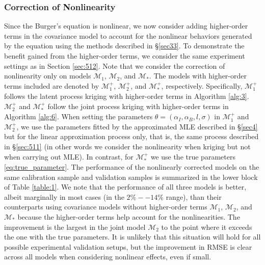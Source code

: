 \documentclass[article,ij4uq]{ij4uq}              %
\begin{document}
\subsubsection{Correction of Nonlinearity}\label{sec:513}
\par Since the Burger's equation is nonlinear, we now consider adding higher-order terms in the covariance model to account for the nonlinear behaviors generated by the equation using the methods described in \S \ref{sec33}. To demonstrate the benefit gained from the higher-order terms, we consider the same experiment settings as in Section \ref{sec:512}. Note that we  consider the correction of nonlinearity only on models $\mathcal{M}_{1}$, $\mathcal{M}_{2}$, and $\mathcal{M}_{*}$. The models with higher-order terms included are denoted by $\mathcal{M}_{1}^{+}$, $\mathcal{M}_{2}^{+}$, and $\mathcal{M}_{*}^{+}$, respectively. Specifically, $\mathcal{M}_{1}^{+}$ follows the latent process kriging with higher-order terms in Algorithm \ref{alg:3}. $\mathcal{M}_{2}^{+}$ and $\mathcal{M}_{*}^{+}$ follow the joint process kriging with higher-order terms in Algorithm \ref{alg:6}. When setting the parameters $\theta=(\alpha_{I},\alpha_{B},l,\sigma)$ in $\mathcal{M}_{1}^{+}$ and $\mathcal{M}_{2}^{+}$, we use the parameters fitted by the approximated MLE described in \S \ref{sec4} but for the linear approximation process only, that is, the same process described in \S \ref{sec:511} (in other words we consider the nonlinearity when kriging but not when carrying out MLE). In contrast, for $\mathcal{M}_{*}^{+}$ we use the true parameters \eqref{eq:true_parameter}. The performance of the nonlinearly corrected models on the same calibration sample and validation samples is summarized in the lower block of Table \ref{table:1}. We note that the performance of all three models is better, albeit marginally in most cases (in the $2 \% -- 14 \%$ range), than their counterparts using covariance models without higher-order terms $\mathcal{M}_{1}$, $\mathcal{M}_{2}$, and $\mathcal{M}_{*}$ because the higher-order terms help account for the nonlinearities. The improvement is the largest in the joint model $\mathcal{M}_{2}$ to the point where it exceeds the one with the true parameters. It is unlikely that this situation will hold for all possible experimental validation setups, but the improvement in RMSE is clear across all models when considering nonlinear effects, even if small. 
\end{document}
